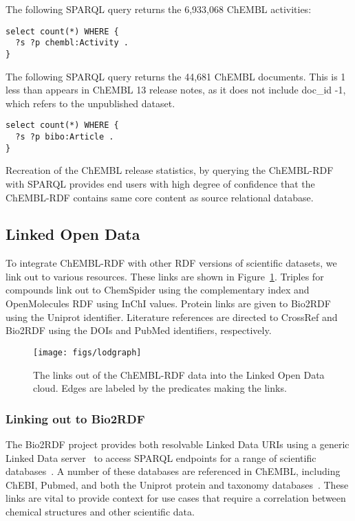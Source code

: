 \documentclass[sw]{iosart2c}
\begin{document}
The following SPARQL query returns the 6,933,068 ChEMBL activities:

\begin{tiny}
\begin{verbatim}
select count(*) WHERE {
  ?s ?p chembl:Activity .
}
\end{verbatim}
\end{tiny}

The following SPARQL query returns the 44,681 ChEMBL documents. This is 1 less than appears 
in ChEMBL 13 release notes, as it does not include doc_id -1, which refers to the 
unpublished dataset.

\begin{tiny}
\begin{verbatim}
select count(*) WHERE {
  ?s ?p bibo:Article .
}
\end{verbatim}
\end{tiny}

Recreation of the ChEMBL release statistics, by querying the ChEMBL-RDF with SPARQL 
provides end users with high degree of confidence that the ChEMBL-RDF contains same 
core content as source relational database. 


\subsection{Linked Open Data}

To integrate ChEMBL-RDF with other RDF versions of scientific datasets, we link out to various resources.
These links are shown in Figure~\ref{2}. Triples for compounds link out to ChemSpider 
using the complementary index and OpenMolecules RDF using InChI values. Protein links are given to Bio2RDF
using the Uniprot identifier. Literature references are directed to CrossRef and Bio2RDF 
using the DOIs and PubMed identifiers, respectively.

\begin{figure}[t]
\texttt{[image: figs/lodgraph]}
\caption{The links out of the ChEMBL-RDF data into the Linked Open Data cloud.
Edges are labeled by the predicates making the links.}\label{2}
\end{figure}

\subsubsection{Linking out to Bio2RDF}

The Bio2RDF project provides both resolvable Linked Data URIs using a generic Linked Data
server~\cite{Ansell2011} to access SPARQL endpoints for a range of scientific databases~\cite{Belleau2008}.
A number of these databases are referenced in ChEMBL, including ChEBI, Pubmed, and both the
Uniprot protein and taxonomy databases~\cite{TheUniProtConsortium2010}. These links are
vital to provide context for use cases that require a correlation between chemical
structures and other scientific data. 
\end{document}
